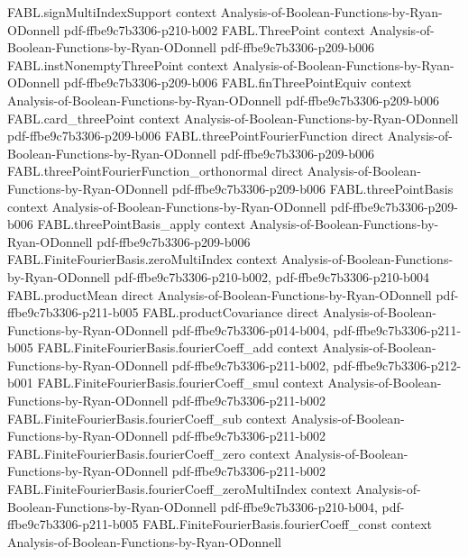 \begin{theorem}
\proofstep
  {FABL.signMultiIndexSupport}
  {context}
  {Analysis-of-Boolean-Functions-by-Ryan-ODonnell}
  {pdf-ffbe9c7b3306-p210-b002}
\proofstep
  {FABL.ThreePoint}
  {context}
  {Analysis-of-Boolean-Functions-by-Ryan-ODonnell}
  {pdf-ffbe9c7b3306-p209-b006}
\proofstep
  {FABL.instNonemptyThreePoint}
  {context}
  {Analysis-of-Boolean-Functions-by-Ryan-ODonnell}
  {pdf-ffbe9c7b3306-p209-b006}
\proofstep
  {FABL.finThreePointEquiv}
  {context}
  {Analysis-of-Boolean-Functions-by-Ryan-ODonnell}
  {pdf-ffbe9c7b3306-p209-b006}
\proofstep
  {FABL.card_threePoint}
  {context}
  {Analysis-of-Boolean-Functions-by-Ryan-ODonnell}
  {pdf-ffbe9c7b3306-p209-b006}
\proofstep
  {FABL.threePointFourierFunction}
  {direct}
  {Analysis-of-Boolean-Functions-by-Ryan-ODonnell}
  {pdf-ffbe9c7b3306-p209-b006}
\proofstep
  {FABL.threePointFourierFunction_orthonormal}
  {direct}
  {Analysis-of-Boolean-Functions-by-Ryan-ODonnell}
  {pdf-ffbe9c7b3306-p209-b006}
\proofstep
  {FABL.threePointBasis}
  {context}
  {Analysis-of-Boolean-Functions-by-Ryan-ODonnell}
  {pdf-ffbe9c7b3306-p209-b006}
\proofstep
  {FABL.threePointBasis_apply}
  {context}
  {Analysis-of-Boolean-Functions-by-Ryan-ODonnell}
  {pdf-ffbe9c7b3306-p209-b006}
\proofstep
  {FABL.FiniteFourierBasis.zeroMultiIndex}
  {context}
  {Analysis-of-Boolean-Functions-by-Ryan-ODonnell}
  {pdf-ffbe9c7b3306-p210-b002,
    pdf-ffbe9c7b3306-p210-b004}
\proofstep
  {FABL.productMean}
  {direct}
  {Analysis-of-Boolean-Functions-by-Ryan-ODonnell}
  {pdf-ffbe9c7b3306-p211-b005}
\proofstep
  {FABL.productCovariance}
  {direct}
  {Analysis-of-Boolean-Functions-by-Ryan-ODonnell}
  {pdf-ffbe9c7b3306-p014-b004,
    pdf-ffbe9c7b3306-p211-b005}
\proofstep
  {FABL.FiniteFourierBasis.fourierCoeff_add}
  {context}
  {Analysis-of-Boolean-Functions-by-Ryan-ODonnell}
  {pdf-ffbe9c7b3306-p211-b002,
    pdf-ffbe9c7b3306-p212-b001}
\proofstep
  {FABL.FiniteFourierBasis.fourierCoeff_smul}
  {context}
  {Analysis-of-Boolean-Functions-by-Ryan-ODonnell}
  {pdf-ffbe9c7b3306-p211-b002}
\proofstep
  {FABL.FiniteFourierBasis.fourierCoeff_sub}
  {context}
  {Analysis-of-Boolean-Functions-by-Ryan-ODonnell}
  {pdf-ffbe9c7b3306-p211-b002}
\proofstep
  {FABL.FiniteFourierBasis.fourierCoeff_zero}
  {context}
  {Analysis-of-Boolean-Functions-by-Ryan-ODonnell}
  {pdf-ffbe9c7b3306-p211-b002}
\proofstep
  {FABL.FiniteFourierBasis.fourierCoeff_zeroMultiIndex}
  {context}
  {Analysis-of-Boolean-Functions-by-Ryan-ODonnell}
  {pdf-ffbe9c7b3306-p210-b004,
    pdf-ffbe9c7b3306-p211-b005}
\proofstep
  {FABL.FiniteFourierBasis.fourierCoeff_const}
  {context}
  {Analysis-of-Boolean-Functions-by-Ryan-ODonnell}

\end{theorem}
